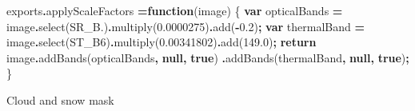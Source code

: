 \documentclass[
]{article}
\newenvironment{Shaded}{\begin{snugshade}}{\end{snugshade}}
\newcommand{\AttributeTok}[1]{\textcolor[rgb]{0.77,0.63,0.00}{#1}}
\newcommand{\ControlFlowTok}[1]{\textcolor[rgb]{0.13,0.29,0.53}{\textbf{#1}}}
\newcommand{\FloatTok}[1]{\textcolor[rgb]{0.00,0.00,0.81}{#1}}
\newcommand{\FunctionTok}[1]{\textcolor[rgb]{0.00,0.00,0.00}{#1}}
\newcommand{\KeywordTok}[1]{\textcolor[rgb]{0.13,0.29,0.53}{\textbf{#1}}}
\newcommand{\NormalTok}[1]{#1}
\newcommand{\OperatorTok}[1]{\textcolor[rgb]{0.81,0.36,0.00}{\textbf{#1}}}
\newcommand{\StringTok}[1]{\textcolor[rgb]{0.31,0.60,0.02}{#1}}
\begin{document}
\begin{Shaded}
\begin{Highlighting}[]
\NormalTok{exports}\OperatorTok{.}\AttributeTok{applyScaleFactors} \OperatorTok{=}\KeywordTok{function}\NormalTok{(image) \{}
  \KeywordTok{var}\NormalTok{ opticalBands }\OperatorTok{=}\NormalTok{ image}\OperatorTok{.}\FunctionTok{select}\NormalTok{(}\StringTok{\textquotesingle{}SR\_B.\textquotesingle{}}\NormalTok{)}\OperatorTok{.}\FunctionTok{multiply}\NormalTok{(}\FloatTok{0.0000275}\NormalTok{)}\OperatorTok{.}\FunctionTok{add}\NormalTok{(}\OperatorTok{{-}}\FloatTok{0.2}\NormalTok{)}\OperatorTok{;}
  \KeywordTok{var}\NormalTok{ thermalBand }\OperatorTok{=}\NormalTok{ image}\OperatorTok{.}\FunctionTok{select}\NormalTok{(}\StringTok{\textquotesingle{}ST\_B6\textquotesingle{}}\NormalTok{)}\OperatorTok{.}\FunctionTok{multiply}\NormalTok{(}\FloatTok{0.00341802}\NormalTok{)}\OperatorTok{.}\FunctionTok{add}\NormalTok{(}\FloatTok{149.0}\NormalTok{)}\OperatorTok{;}
  \ControlFlowTok{return}\NormalTok{ image}\OperatorTok{.}\FunctionTok{addBands}\NormalTok{(opticalBands}\OperatorTok{,} \KeywordTok{null}\OperatorTok{,} \KeywordTok{true}\NormalTok{)}
              \OperatorTok{.}\FunctionTok{addBands}\NormalTok{(thermalBand}\OperatorTok{,} \KeywordTok{null}\OperatorTok{,} \KeywordTok{true}\NormalTok{)}\OperatorTok{;}
\NormalTok{\}}
\end{Highlighting}
\end{Shaded}

Cloud and snow mask
\end{document}
